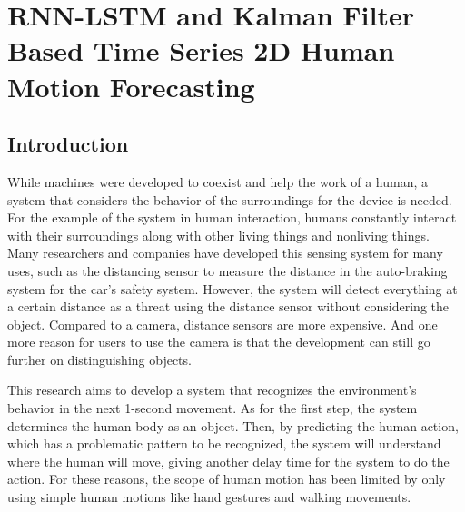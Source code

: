 
\chapter{RNN-LSTM and Kalman Filter Based Time Series 2D Human Motion Forecasting}\label{2} %


\section{Introduction}\label{2:intro}
While machines were developed to coexist and help the work of a human, a system that considers the behavior of the surroundings for the device is needed. For the example of the system in human interaction, humans constantly interact with their surroundings along with other living things and nonliving things. Many researchers and companies have developed this sensing system for many uses, such as the distancing sensor to measure the distance in the auto-braking system for the car's safety system. 
However, the system will detect everything at a certain distance as a threat using the distance sensor without considering the object. Compared to a camera, distance sensors are more expensive. And one more reason for users to use the camera is that the development can still go further on distinguishing objects. 

This research aims to develop a system that recognizes the environment's behavior in the next 1-second movement. As for the first step, the system determines the human body as an object. Then, by predicting the human action, which has a problematic pattern to be recognized, the system will understand where the human will move, giving another delay time for the system to do the action. For these reasons, the scope of human motion has been limited by only using simple human motions like hand gestures and walking movements.

